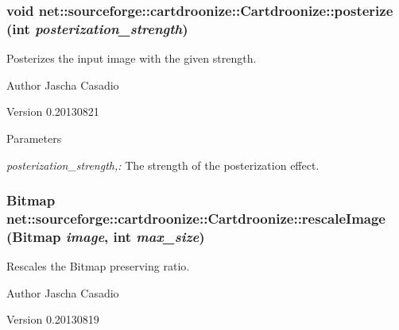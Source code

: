 \hypertarget{classnet_1_1sourceforge_1_1cartdroonize_1_1Cartdroonize_a6ffb29702adb9521fe9b3d68e312f18d}{
\subsubsection[{posterize}]{\setlength{\rightskip}{0pt plus 5cm}void net::sourceforge::cartdroonize::Cartdroonize::posterize (int {\em posterization\_\-strength})}}
\label{classnet_1_1sourceforge_1_1cartdroonize_1_1Cartdroonize_a6ffb29702adb9521fe9b3d68e312f18d}


Posterizes the input image with the given strength. \begin{DoxyAuthor}{Author}
Jascha Casadio 
\end{DoxyAuthor}
\begin{DoxyVersion}{Version}
0.20130821 
\end{DoxyVersion}

\begin{DoxyParams}{Parameters}
\item[{\em posterization\_\-strength,:}]The strength of the posterization effect.\end{DoxyParams}


\hypertarget{classnet_1_1sourceforge_1_1cartdroonize_1_1Cartdroonize_ae9ef33e35b95674d616d2a1e7bc527f2}{
\subsubsection[{rescaleImage}]{\setlength{\rightskip}{0pt plus 5cm}Bitmap net::sourceforge::cartdroonize::Cartdroonize::rescaleImage (Bitmap {\em image}, \/  int {\em max\_\-size})}}
\label{classnet_1_1sourceforge_1_1cartdroonize_1_1Cartdroonize_ae9ef33e35b95674d616d2a1e7bc527f2}


Rescales the Bitmap preserving ratio. \begin{DoxyAuthor}{Author}
Jascha Casadio 
\end{DoxyAuthor}
\begin{DoxyVersion}{Version}
0.20130819 
\end{DoxyVersion}


